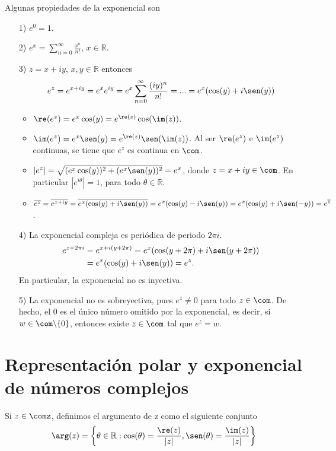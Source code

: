Algunas propiedades de la exponencial son
\begin{enumerate}
    \item[1)] $e^0 = 1$.
    \item[2)] $e^x = \sum_{n=0}^{\infty}{\frac{x^n}{n!}}$, $x \in \mathbb{R}$.
    \item[3)] $z = x +iy$, $x,y \in \mathbb{R}$ entonces
    \begin{align*}
        e^z = e^{x+iy} = e^{x}e^{iy} = e^{x}\sum_{n=0}^{\infty}{\frac{(iy)^n}{n!}} = ... = e^{x}(\cos(y) + i\sen(y))
    \end{align*}
    \begin{itemize}
        \item $\re(e^z) = e^x\cos(y) = e^{\re(z)}\cos(\im(z))$.
        \item $\im(e^z) = e^x\sen(y) = e^{\re(z)}\sen(\im(z))$.
        \newline
        Al ser $\re(e^z)$ e $\im(e^z)$ continuas, se tiene que $e^z$ es continua en $\com$.
    \item $|e^z| = \sqrt{(e^x\cos(y))^2 + (e^x\sen(y))^2} = e^x$, donde $z = x + iy \in \com$. En particular $|e^{i\theta}| = 1$, para todo $\theta \in \mathbb{R}$.
    \item $\overline{e^z} = \overline{e^{x +iy}} = \overline{e^x(\cos(y) + i\sen(y))} = e^x(\cos(y) - i\sen(y)) = e^x(\cos(y) + i\sen(-y)) = e^{\overline{z}}$.
    \end{itemize}
    \item[4)] La exponencial compleja es periódica de periodo $2\pi i$.
    \begin{align*}
        e^{z + 2\pi i} &= e^{x + i(y + 2\pi)} = e^x(\cos(y + 2\pi) + i\sen(y + 2\pi)) \\
        &= e^x(\cos(y) + i\sen(y)) = e^z.
    \end{align*}
    En particular, la exponencial no es inyectiva.
    \item[5)] La exponencial no es sobreyectiva, pues $e^z \not = 0$ para todo $z \in \com$. De hecho, el $0$ es el único número omitido por la exponencial, es decir, si $w \in \com \backslash \{0\}$, entonces existe $z \in \com$ tal que $e^z = w$.
\end{enumerate}

\section{Representación polar y exponencial de números complejos}

\begin{defi}
Si $z \in \comz$, definimos el argumento de z como el siguiente conjunto
\begin{align*}
    \arg(z) = \left\{ \theta \in \mathbb{R} : \cos(\theta) = \frac{\re(z)}{|z|}, \sen(\theta) = \frac{\im(z)}{|z|} \right\}
\end{align*}
\end{defi}


